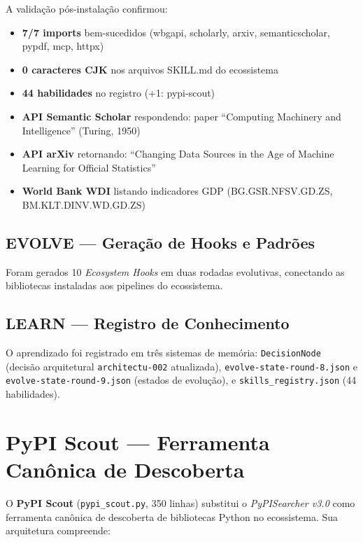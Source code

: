 \documentclass[12pt,a4paper]{article}
\begin{document}
A validação pós-instalação confirmou:
\begin{itemize}
  \item \textbf{7/7 imports} bem-sucedidos (wbgapi, scholarly, arxiv, semanticscholar, pypdf, mcp, httpx)
  \item \textbf{0 caracteres CJK} nos arquivos SKILL.md do ecossistema
  \item \textbf{44 habilidades} no registro (+1: pypi-scout)
  \item \textbf{API Semantic Scholar} respondendo: paper ``Computing Machinery and Intelligence'' (Turing, 1950)
  \item \textbf{API arXiv} retornando: ``Changing Data Sources in the Age of Machine Learning for Official Statistics''
  \item \textbf{World Bank WDI} listando indicadores GDP (BG.GSR.NFSV.GD.ZS, BM.KLT.DINV.WD.GD.ZS)
\end{itemize}

\subsection{EVOLVE — Geração de Hooks e Padrões}

Foram gerados 10 \textit{Ecosystem Hooks} em duas rodadas evolutivas, conectando as bibliotecas instaladas aos pipelines do ecossistema.

\subsection{LEARN — Registro de Conhecimento}

O aprendizado foi registrado em três sistemas de memória: \texttt{DecisionNode} (decisão arquitetural \texttt{architectu-002} atualizada), \texttt{evolve-state-round-8.json} e \texttt{evolve-state-round-9.json} (estados de evolução), e \texttt{skills\_registry.json} (44 habilidades).

\section{PyPI Scout — Ferramenta Canônica de Descoberta}

O \textbf{PyPI Scout} (\texttt{pypi\_scout.py}, 350 linhas) substitui o \textit{PyPISearcher v3.0} como ferramenta canônica de descoberta de bibliotecas Python no ecossistema. Sua arquitetura compreende:
\end{document}
